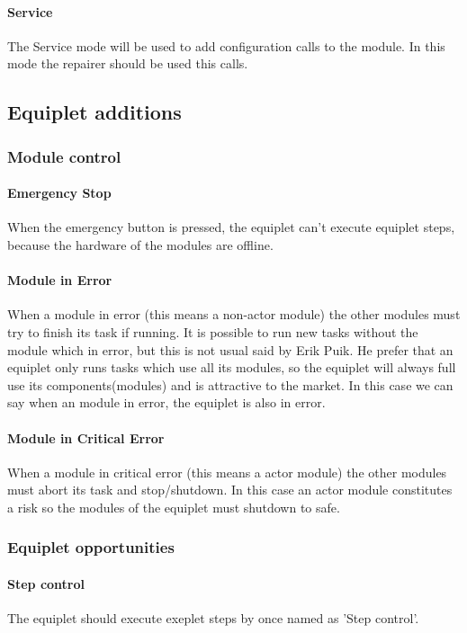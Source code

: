 \documentclass[12pt,a4paper]{report}
\begin{document}
\paragraph{Service}The Service mode will be used to add configuration calls to the module. In this mode the repairer should be used this calls.

\subsection{Equiplet additions}
\subsubsection{Module control}
\paragraph{Emergency Stop}
When the emergency button is pressed, the equiplet can't execute equiplet steps, because the hardware of the modules are offline.
\paragraph{Module in Error}
When a module in error (this means a non-actor module) the other modules must try to finish its task if running. It is possible to run new tasks without the module which in error, but this is not usual said by Erik Puik. He prefer that an equiplet only runs tasks which use all its modules, so the equiplet will always full use its components(modules) and is attractive to the market. In this case we can say when an module in error, the equiplet is also in error.
\paragraph{Module in Critical Error}
When a module in critical error (this means a actor module) the other modules must abort its task and stop/shutdown. In this case an actor module constitutes a risk so the modules of the equiplet must shutdown to safe.

\subsubsection{Equiplet opportunities}
\paragraph{Step control}
The equiplet should execute exeplet steps by once named as 'Step control'.
\end{document}
